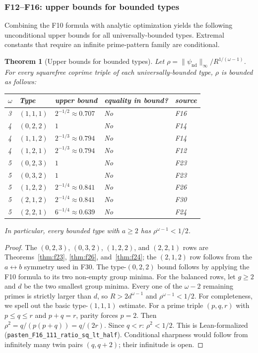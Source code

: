 \documentclass[12pt]{article}
\newtheorem{theorem}{Theorem}
\theoremstyle{definition}
\begin{document}
\subsubsection*{F12--F16: upper bounds for bounded types}

Combining the F10 formula with analytic optimization yields the following
unconditional upper bounds for all universally-bounded types.  Extremal
constants that require an infinite prime-pattern family are conditional.

\begin{theorem}[Upper bounds for bounded types]\label{thm:sharp}
Let $\rho = \|\psi_\mathrm{nd}\|_\infty / R^{1/(\omega-1)}$.
For every squarefree coprime triple of each universally-bounded type,
$\rho$ is bounded as follows:

\begin{center}
\begin{tabular}{lllll}
\hline
$\omega$ & Type & upper bound & equality in bound? & source \\
\hline
3 & $(1,1,1)$ & $2^{-1/2} \approx 0.707$ & No & F16 \\
4 & $(0,2,2)$ & $1$ & No & F14 \\
4 & $(1,1,2)$ & $2^{-1/3} \approx 0.794$ & No & F14 \\
4 & $(1,2,1)$ & $2^{-1/3} \approx 0.794$ & No & F12 \\
5 & $(0,2,3)$ & $1$ & No & F23 \\
5 & $(0,3,2)$ & $1$ & No & F23 \\
5 & $(1,2,2)$ & $2^{-1/4} \approx 0.841$ & No & F26 \\
5 & $(2,1,2)$ & $2^{-1/4} \approx 0.841$ & No & F30 \\
5 & $(2,2,1)$ & $6^{-1/4} \approx 0.639$ & No & F24 \\
\hline
\end{tabular}
\end{center}
In particular, every bounded type with $a\ge2$ has
$\rho^{\omega-1}<1/2$.
\end{theorem}

\begin{proof}
The $(0,2,3)$, $(0,3,2)$, $(1,2,2)$, and $(2,2,1)$ rows are
Theorems~\ref{thm:f23}, \ref{thm:f26}, and~\ref{thm:f24}; the
$(2,1,2)$ row follows from the $a\leftrightarrow b$ symmetry used in F30.
The type-$(0,2,2)$ bound follows by applying the F10 formula to its two
non-empty group minima.  For the balanced rows, let $g\ge2$ and $d$ be the
two smallest group minima.  Every one of the $\omega-2$ remaining primes is
strictly larger than $d$, so $R>2d^{\omega-1}$ and
$\rho^{\omega-1}<1/2$.  For completeness, we spell out the basic
type-$(1,1,1)$ estimate.
For a prime triple $(p,q,r)$ with $p \le q \le r$ and $p + q = r$,
parity forces $p = 2$.  Then $\rho^2 = q/(p(p+q)) = q/(2r)$.
Since $q < r$: $\rho^2 < 1/2$.
This is Lean-formalized (\texttt{pasten\_F16\_111\_ratio\_sq\_lt\_half}).
Conditional sharpness would follow from infinitely many twin pairs
$(q,q+2)$; their infinitude is open.
\end{proof}
\end{document}
